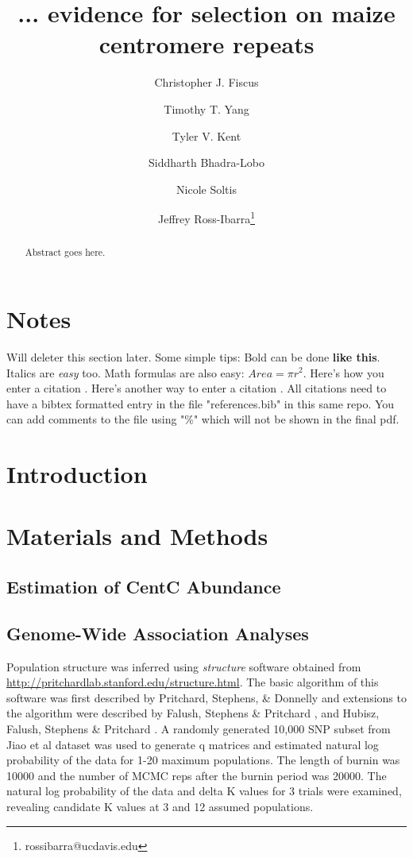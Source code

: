 \documentclass[12pt]{article}
\title{... evidence for selection on maize centromere repeats}
\author[1]{Christopher J. Fiscus}
\author[1]{Timothy T. Yang}
\author[1]{Tyler V. Kent}
\author[1]{Siddharth Bhadra-Lobo}
\author[1]{Nicole Soltis}
\author[1,2]{Jeffrey Ross-Ibarra\thanks{rossibarra@ucdavis.edu}}
\affil[1]{Department of Plant Sciences, University of California Davis}
\affil[2]{Center for Population Biology and Genome Center, University of California Davis}
\date{}
\begin{document}
\maketitle

\begin{abstract}
Abstract goes here.
\end{abstract}

\begin{footnotesize}
\end{footnotesize}

\section*{Notes}

Will deleter this section later.  Some simple tips:
Bold can be done {\bf like this}.  Italics are \emph{easy} too.  Math formulas are also easy: $Area=\pi r^2$.
Here's how you enter a citation \cite{Wolfgruber2009}.
Here's another way to enter a citation \citep{Wolfgruber2009}.
All citations need to have a bibtex formatted entry in the file "references.bib" in this same repo. You can add comments to the file using "\%" which will not be shown in the final pdf.  

\section{Introduction}

\section{Materials and Methods}

\subsection{Estimation of CentC Abundance} %

\subsection{Genome-Wide Association Analyses} %
Population structure was inferred using \emph{structure} software obtained from \url{http://pritchardlab.stanford.edu/structure.html}.  The basic algorithm of this software was first described by Pritchard, Stephens, \& Donnelly \cite{Pritchard2000} and extensions to the algorithm were described by Falush, Stephens \& Pritchard \cite{Falush2003}, \cite{Falush2007} and Hubisz, Falush, Stephens \& Pritchard \cite{Hubisz2009}. A randomly generated 10,000 SNP subset from Jiao et al dataset was used to generate q matrices and estimated natural log probability of the data for 1-20 maximum populations.  The length of burnin was 10000 and the number of MCMC reps after the burnin period was 20000.  The natural log probability of the data and delta K values for 3 trials were examined, revealing candidate K values at 3 and 12 assumed populations.    
\end{document}
